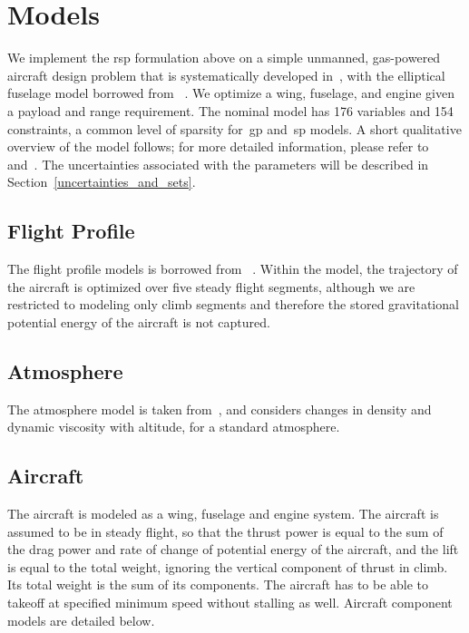 \section{Models}

We implement the \gls{rsp} formulation above on a simple unmanned, gas-powered
aircraft design problem that is systematically developed in~\cite{Ozturk2018},
with the elliptical fuselage model borrowed from ~\cite{Burton2017}.
We optimize a wing, fuselage, and engine given a payload and range requirement.
The nominal model has 176 variables and 154 constraints, a common level of
sparsity for~\gls{gp} and~\gls{sp} models.
A short qualitative overview of the model follows; for
more detailed information, please refer to~\cite{Ozturk2018} and~\cite{Burton2017}. The uncertainties
associated with the parameters will be described in Section~\ref{uncertainties_and_sets}.

\subsection{Flight Profile}

The flight profile models is borrowed from ~\cite{York2018}. Within the model, the
trajectory of the aircraft is optimized over five steady flight segments,
although we are restricted to modeling only climb segments
and therefore the stored gravitational potential energy of the aircraft is not captured.

\subsection{Atmosphere}

The atmosphere model is taken from~\cite{Tao2018}, and considers changes in density and dynamic
viscosity with altitude, for a standard atmosphere.

\subsection{Aircraft}

The aircraft is modeled as a wing, fuselage and engine system. The aircraft is assumed
to be in steady flight, so that the thrust power is equal to the sum of the drag power and rate of change
of potential energy of the aircraft, and the lift is equal to the total weight, ignoring the vertical component of
thrust in climb. Its total weight is the sum of its components.
The aircraft has to be able to takeoff at specified minimum speed without stalling as well.
Aircraft component models are detailed below.


